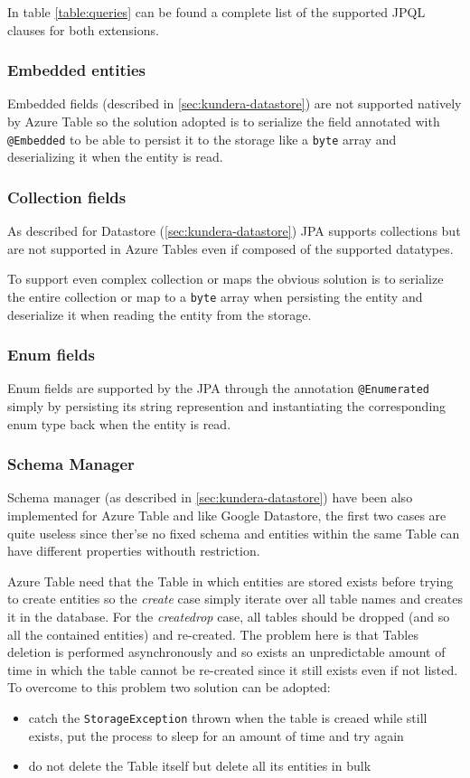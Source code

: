 \noindent In table \ref{table:queries} can be found a complete list of the supported JPQL clauses for both extensions.

\subsubsection{Embedded entities}
Embedded fields (described in \ref{sec:kundera-datastore}) are not supported natively by Azure Table so the solution adopted is to serialize the field annotated with \texttt{@Embedded} to be able to persist it to the storage like a \texttt{byte} array and deserializing it when the entity is read.

\subsubsection{Collection fields}
As described for Datastore (\ref{sec:kundera-datastore}) JPA supports collections but are not supported in Azure Tables even if composed of the supported datatypes.

\noindent To support even complex collection or maps the obvious solution is to serialize the entire collection or map to a \texttt{byte} array when persisting the entity and deserialize it when reading the entity from the storage.

\subsubsection{Enum fields}
Enum fields are supported by the JPA through the annotation \texttt{@Enumerated}  simply by persisting its string represention and instantiating the corresponding enum type back when the entity is read.

\subsubsection{Schema Manager}
Schema manager (as described in \ref{sec:kundera-datastore}) have been also implemented for Azure Table and like Google Datastore, the first two cases are quite useless since ther'se no fixed schema and entities within the same Table can have different properties withouth restriction.

\newparagraph Azure Table need that the Table in which entities are stored exists before trying to create entities so the \textit{create} case simply iterate over all table names and creates it in the database. 
For the \textit{create\textunderscore drop} case, all tables should be dropped (and so all the contained entities) and re-created. The problem here is that Tables deletion is performed asynchronously and so exists an unpredictable amount of time in which the table cannot be re-created since it still exists even if not listed.
\noindent To overcome to this problem two solution can be adopted:
\begin{itemize}
\item catch the \texttt{StorageException} thrown when the table is creaed while still exists, put the process to sleep for an amount of time and try again
\item do not delete the Table itself but delete all its entities in bulk
\end{itemize}

